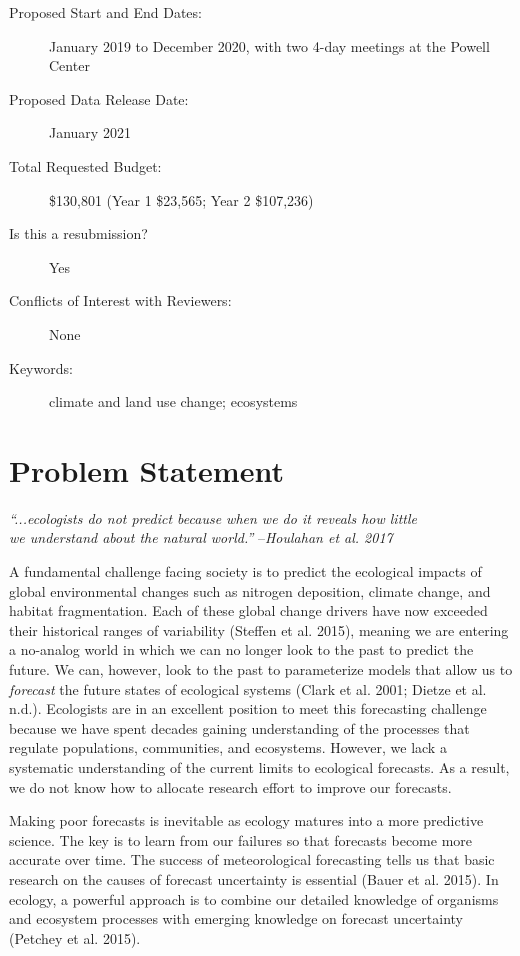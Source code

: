 \documentclass[12pt,]{article}
\begin{document}
\begin{description}
\item[Proposed Start and End Dates:] January 2019 to December 2020, with two 4-day meetings at the Powell Center
\item[Proposed Data Release Date:] January 2021
\item[Total Requested Budget:] \$130,801 (Year 1 \$23,565; Year 2 \$107,236)
\item[Is this a resubmission?] Yes
\item[Conflicts of Interest with Reviewers:] None
\item[Keywords:] climate and land use change; ecosystems
\end{description}

\newpage{}


\section{Problem Statement}

\vspace{-1em} \small{}
\phantom{}\hspace{8em}\textit{``...ecologists do not predict because when we do it reveals how little\\\phantom{}\hspace{8em}we understand about the natural world.''}
--\textit{Houlahan et al. 2017}

\normalsize{} \vspace{0.5em} A fundamental challenge facing society is
to predict the ecological impacts of global environmental changes such
as nitrogen deposition, climate change, and habitat fragmentation. Each
of these global change drivers have now exceeded their historical ranges
of variability (Steffen et al. 2015), meaning we are entering a
no-analog world in which we can no longer look to the past to predict
the future. We can, however, look to the past to parameterize models
that allow us to \emph{forecast} the future states of ecological systems
(Clark et al. 2001; Dietze et al. n.d.). Ecologists are in an excellent
position to meet this forecasting challenge because we have spent
decades gaining understanding of the processes that regulate
populations, communities, and ecosystems. However, we lack a systematic
understanding of the current limits to ecological forecasts. As a
result, we do not know how to allocate research effort to improve our
forecasts.

Making poor forecasts is inevitable as ecology matures into a more
predictive science. The key is to learn from our failures so that
forecasts become more accurate over time. The success of meteorological
forecasting tells us that basic research on the causes of forecast
uncertainty is essential (Bauer et al. 2015). In ecology, a powerful
approach is to combine our detailed knowledge of organisms and ecosystem
processes with emerging knowledge on forecast uncertainty (Petchey et
al. 2015).
\end{document}
